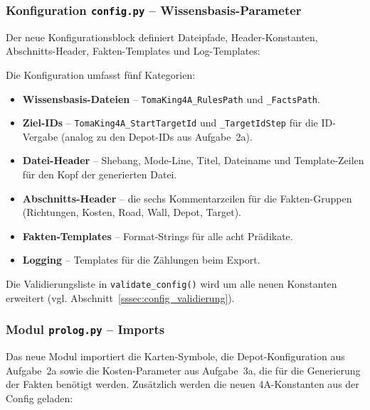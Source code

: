 
\subsubsection{Konfiguration \texttt{config.py} – Wissensbasis-Parameter}

Der neue Konfigurationsblock definiert Dateipfade, Header-Konstanten, Abschnitts-Header, Fakten-Templates und Log-Templates:



Die Konfiguration umfasst fünf Kategorien:
\begin{itemize}
    \item \textbf{Wissensbasis-Dateien} -- \texttt{TomaKing4A\_RulesPath} und \texttt{\_FactsPath}.
    \item \textbf{Ziel-IDs} -- \texttt{TomaKing4A\_StartTargetId} und \texttt{\_TargetIdStep} für die ID-Vergabe (analog zu den Depot-IDs aus Aufgabe~2a).
    \item \textbf{Datei-Header} -- Shebang, Mode-Line, Titel, Dateiname und Template-Zeilen für den Kopf der generierten Datei.
    \item \textbf{Abschnitts-Header} -- die sechs Kommentarzeilen für die Fakten-Gruppen (Richtungen, Kosten, Road, Wall, Depot, Target).
    \item \textbf{Fakten-Templates} -- Format-Strings für alle acht Prädikate.
    \item \textbf{Logging} -- Templates für die Zählungen beim Export.
\end{itemize}

Die Validierungsliste in \texttt{validate\_config()} wird um alle neuen Konstanten erweitert (vgl. Abschnitt~\ref{sssec:config_validierung}).


\subsubsection{Modul \texttt{prolog.py} – Imports}

Das neue Modul importiert die Karten-Symbole, die Depot-Konfiguration aus Aufgabe~2a sowie die Kosten-Parameter aus Aufgabe~3a, die für die Generierung der Fakten benötigt werden. Zusätzlich werden die neuen 4A-Konstanten aus der Config geladen:

